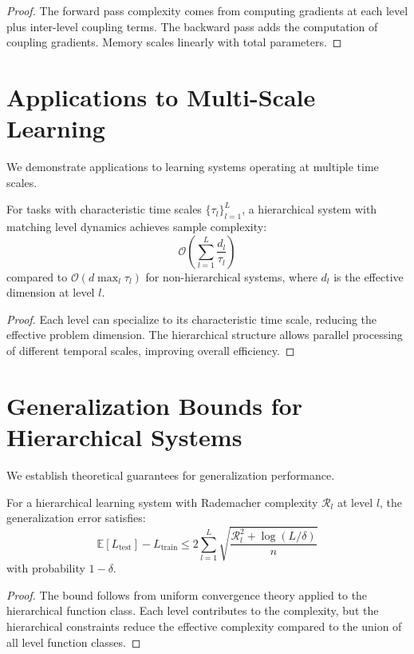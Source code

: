 \begin{proof}
The forward pass complexity comes from computing gradients at each level plus inter-level coupling terms. The backward pass adds the computation of coupling gradients. Memory scales linearly with total parameters.
\end{proof}

\section{Applications to Multi-Scale Learning}

We demonstrate applications to learning systems operating at multiple time scales.

\begin{theorem}
\label{thm:multiscale_performance}
For tasks with characteristic time scales $\{\tau_l\}_{l=1}^L$, a hierarchical system with matching level dynamics achieves sample complexity:
$$\mathcal{O}\left(\sum_{l=1}^L \frac{d_l}{\tau_l}\right)$$
compared to $\mathcal{O}(d \max_l \tau_l)$ for non-hierarchical systems, where $d_l$ is the effective dimension at level $l$.
\end{theorem}

\begin{proof}
Each level can specialize to its characteristic time scale, reducing the effective problem dimension. The hierarchical structure allows parallel processing of different temporal scales, improving overall efficiency.
\end{proof}

\section{Generalization Bounds for Hierarchical Systems}

We establish theoretical guarantees for generalization performance.

\begin{theorem}
\label{thm:hierarchical_generalization}
For a hierarchical learning system with Rademacher complexity $\mathcal{R}_l$ at level $l$, the generalization error satisfies:
$$\mathbb{E}[L_{\text{test}}] - L_{\text{train}} \leq 2\sum_{l=1}^L \sqrt{\frac{\mathcal{R}_l^2 + \log(L/\delta)}{n}}$$
with probability $1-\delta$.
\end{theorem}

\begin{proof}
The bound follows from uniform convergence theory applied to the hierarchical function class. Each level contributes to the complexity, but the hierarchical constraints reduce the effective complexity compared to the union of all level function classes.
\end{proof}

